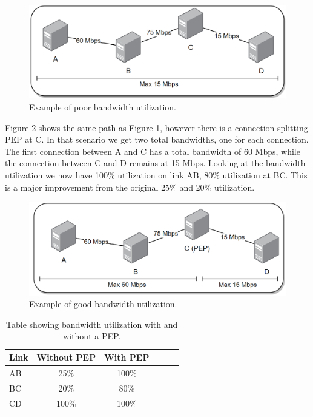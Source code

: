 \documentclass[a4paper,english, 12pt]{report}
\begin{document}
\begin{figure}[h!] %
	\centering
	\includegraphics[scale=0.45]{../diagrams/drawio/bandwidth_bad.png}
  	\caption{Example of poor bandwidth utilization.}
  	\label{fig:pep_bandwidth_bad}
\end{figure}

Figure \ref{fig:pep_bandwidth_good} shows the same path as Figure \ref{fig:pep_bandwidth_bad}, however there is a connection splitting PEP at C. In that scenario we get two total bandwidths, one for each connection. The first connection between A and C has a total bandwidth of 60 Mbps, while the connection between C and D remains at 15 Mbps. Looking at the bandwidth utilization we now have 100\% utilization on link AB, 80\% utilization at BC. This is a major improvement from the original 25\% and 20\% utilization.

\begin{figure}[h!] %
	\centering
	\includegraphics[scale=0.45]{../diagrams/drawio/bandwidth_good.png}
  	\caption{Example of good bandwidth utilization.}
  	\label{fig:pep_bandwidth_good}
\end{figure}


\begin{table}[h!]
\centering
\begin{tabularx}{\linewidth}{lCCCCC}
\toprule
Link & Without PEP & With PEP \\
\midrule
AB & 25\% & 100\%\\
BC & 20\% & 80\% \\
CD & 100\% & 100\% \\
\bottomrule
\end{tabularx}
\caption{Table showing bandwidth utilization with and without a PEP.}
\label{tab:pep_bandwidth_table}
\end{table}
\end{document}
